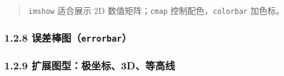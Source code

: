 \begin{Shaded}
\begin{Highlighting}[]
\end{Highlighting}
\end{Shaded}

\begin{quote}
\texttt{imshow} 适合展示 2D 数值矩阵；\texttt{cmap}
控制配色，\texttt{colorbar} 加色标。
\end{quote}

\subsubsection{\texorpdfstring{1.2.8
误差棒图（\texttt{errorbar}）}{1.2.8 误差棒图（errorbar）}}\label{ux8befux5deeux68d2ux56feerrorbar}

\begin{Shaded}
\begin{Highlighting}[]

\OperatorTok{=}\NormalTok{, }\NormalTok{, }\NormalTok{)}
\OperatorTok{=}\OperatorTok{{-}}
\OperatorTok{=}  \OperatorTok{+}  \OperatorTok{*}
\OperatorTok{=}  \OperatorTok{*}
\OperatorTok{=}\OperatorTok{=}\OperatorTok{=}\NormalTok{)}
\NormalTok{)}
\NormalTok{(}
\end{Highlighting}
\end{Shaded}

\begin{Shaded}
\begin{Highlighting}[]
\end{Highlighting}
\end{Shaded}

\subsubsection{1.2.9
扩展图型：极坐标、3D、等高线}\label{ux6269ux5c55ux56feux578bux6781ux5750ux68073dux7b49ux9ad8ux7ebf}

